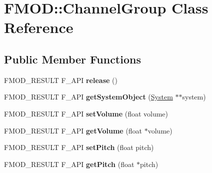 \hypertarget{class_f_m_o_d_1_1_channel_group}{\section{F\-M\-O\-D\-:\-:Channel\-Group Class Reference}
\label{class_f_m_o_d_1_1_channel_group}
}
\subsection*{Public Member Functions}
\begin{DoxyCompactItemize}
\item 
\hypertarget{class_f_m_o_d_1_1_channel_group_a4f7fc3cf21050e3cd5e84f8a2f9a0fc9}{F\-M\-O\-D\-\_\-\-R\-E\-S\-U\-L\-T F\-\_\-\-A\-P\-I {\bfseries release} ()}\label{class_f_m_o_d_1_1_channel_group_a4f7fc3cf21050e3cd5e84f8a2f9a0fc9}

\item 
\hypertarget{class_f_m_o_d_1_1_channel_group_ad31856ea134d39c0757e6b6b2abeabcc}{F\-M\-O\-D\-\_\-\-R\-E\-S\-U\-L\-T F\-\_\-\-A\-P\-I {\bfseries get\-System\-Object} (\hyperlink{class_f_m_o_d_1_1_system}{System} $\ast$$\ast$system)}\label{class_f_m_o_d_1_1_channel_group_ad31856ea134d39c0757e6b6b2abeabcc}

\item 
\hypertarget{class_f_m_o_d_1_1_channel_group_ab2202bf291f95b99cb8f69796c7b5405}{F\-M\-O\-D\-\_\-\-R\-E\-S\-U\-L\-T F\-\_\-\-A\-P\-I {\bfseries set\-Volume} (float volume)}\label{class_f_m_o_d_1_1_channel_group_ab2202bf291f95b99cb8f69796c7b5405}

\item 
\hypertarget{class_f_m_o_d_1_1_channel_group_ac3ccba7965c6b5591dc355e4a785f145}{F\-M\-O\-D\-\_\-\-R\-E\-S\-U\-L\-T F\-\_\-\-A\-P\-I {\bfseries get\-Volume} (float $\ast$volume)}\label{class_f_m_o_d_1_1_channel_group_ac3ccba7965c6b5591dc355e4a785f145}

\item 
\hypertarget{class_f_m_o_d_1_1_channel_group_af765eda64e3ab4dc771204b1c1850d42}{F\-M\-O\-D\-\_\-\-R\-E\-S\-U\-L\-T F\-\_\-\-A\-P\-I {\bfseries set\-Pitch} (float pitch)}\label{class_f_m_o_d_1_1_channel_group_af765eda64e3ab4dc771204b1c1850d42}

\item 
\hypertarget{class_f_m_o_d_1_1_channel_group_a7f209b70b88c1f044ae9ee7debf33834}{F\-M\-O\-D\-\_\-\-R\-E\-S\-U\-L\-T F\-\_\-\-A\-P\-I {\bfseries get\-Pitch} (float $\ast$pitch)}\label{class_f_m_o_d_1_1_channel_group_a7f209b70b88c1f044ae9ee7debf33834}


\end{DoxyCompactItemize}
